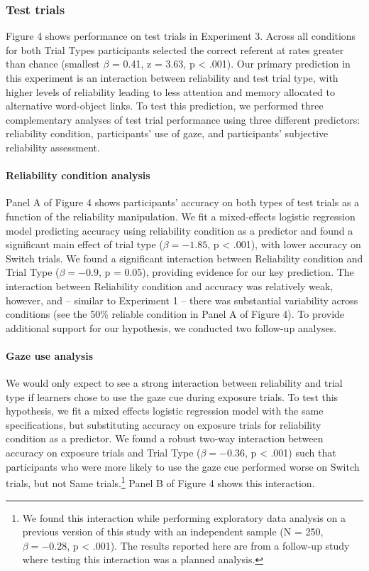 \documentclass[authoryear, review]{elsarticle}
\begin{document}
\subsubsection{Test trials}\label{test-trials-2}

Figure 4 shows performance on test trials in Experiment 3. Across all
conditions for both Trial Types participants selected the correct
referent at rates greater than chance (smallest \(\beta\) = 0.41, z =
3.63, p \textless{} .001). Our primary prediction in this experiment is
an interaction between reliability and test trial type, with higher
levels of reliability leading to less attention and memory allocated to
alternative word-object links. To test this prediction, we performed
three complementary analyses of test trial performance using three
different predictors: reliability condition, participants' use of gaze,
and participants' subjective reliability assessment.

\paragraph{Reliability condition
analysis}\label{reliability-condition-analysis}

Panel A of Figure 4 shows participants' accuracy on both types of test
trials as a function of the reliability manipulation. We fit a
mixed-effects logistic regression model predicting accuracy using
reliability condition as a predictor and found a significant main effect
of trial type (\(\beta = -1.85\), p \textless{} .001), with lower
accuracy on Switch trials. We found a significant interaction between
Reliability condition and Trial Type (\(\beta = -0.9\), p = 0.05),
providing evidence for our key prediction. The interaction between
Reliability condition and accuracy was relatively weak, however, and --
similar to Experiment 1 -- there was substantial variability across
conditions (see the 50\% reliable condition in Panel A of Figure 4). To
provide additional support for our hypothesis, we conducted two
follow-up analyses.

\paragraph{Gaze use analysis}\label{gaze-use-analysis}

We would only expect to see a strong interaction between reliability and
trial type if learners chose to use the gaze cue during exposure trials.
To test this hypothesis, we fit a mixed effects logistic regression
model with the same specifications, but substituting accuracy on
exposure trials for reliability condition as a predictor. We found a
robust two-way interaction between accuracy on exposure trials and Trial
Type (\(\beta = -0.36\), p \textless{} .001) such that participants who
were more likely to use the gaze cue performed worse on Switch trials,
but not Same trials.\footnote{We found this interaction while performing
  exploratory data analysis on a previous version of this study with an
  independent sample (N = 250, \(\beta = -0.28\), p \textless{} .001).
  The results reported here are from a follow-up study where testing
  this interaction was a planned analysis.} Panel B of Figure 4 shows
this interaction.
\end{document}
